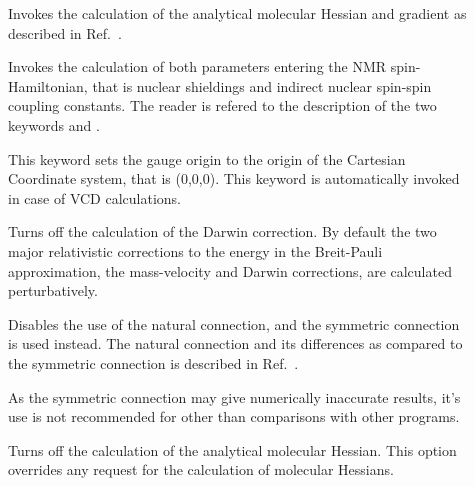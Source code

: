 \begin{description}
\item[] Invokes the calculation of the analytical
molecular Hessian and gradient as
described in Ref.~\cite{tuhjahjajpjjcp84}. 


\item[] Invokes the calculation of both parameters
entering the NMR spin-Hamiltonian, that is nuclear
shieldings and
indirect nuclear spin-spin coupling
constants. The reader is refered to the 
description of the two keywords  and .

\item[] This keyword sets the gauge
origin  to the origin of the Cartesian Coordinate system,
that is (0,0,0). This keyword is automatically invoked in case of VCD
calculations.

\item[] Turns off the calculation of the Darwin
correction. By default the two major relativistic
corrections to the energy in the Breit-Pauli approximation, the
mass-velocity and Darwin 
corrections, are calculated 
perturbatively.

\item[] Disables the use of the natural
connection, and 
the symmetric connection is used instead. The
natural connection and 
its differences as compared to the symmetric connection is described
in Ref.~\cite{joklbkrthpjtca90,krthjopjklbcpl235}. 

As the symmetric connection may give numerically inaccurate results,
it's use is not recommended for other than comparisons with other
programs.

\item[] Turns off the calculation of the analytical
molecular Hessian. This option overrides any request for the
calculation of molecular Hessians.


\end{description}
